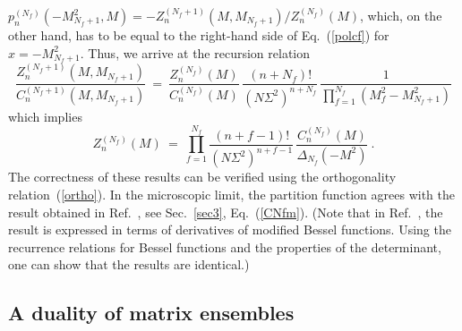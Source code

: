 $p_n^{(N_f)}(-M_{N_f+1}^2,M)=-Z_n^{(N_f+1)}(M,M_{N_f+1})/Z_n^{(N_f)}(M)$,
which, on the other hand, has to be equal to the right-hand side of
Eq.~(\ref{polcf}) for $x=-M_{N_f+1}^2$. Thus, we arrive at the
recursion relation
\begin{equation}
\frac{Z_n^{(N_f+1)}(M,M_{N_f+1})}{C_n^{(N_f+1)}(M,M_{N_f+1})} 
\ = \ \frac{Z_n^{(N_f)}(M)}{C_n^{(N_f)}(M)} 
       \, \frac{(n+N_f)!}{(N\Sigma^2)^{n+N_f}} \,
          \frac{1}{\prod_{f=1}^{N_f}(M_f^2-M_{N_f+1}^2)} 
\label{recurs}
\end{equation} 
which implies
\begin{equation}
Z_n^{(N_f)}(M) \ = \ \prod_{f=1}^{N_f} \frac{(n+f-1)!}
{(N\Sigma^2)^{n+f-1}}\,\frac{C_n^{(N_f)}(M)}{\Delta_{N_f}(-M^2)}\:.
\label{parterg}
\end{equation} 
The correctness of these results can be verified using the
orthogonality relation~(\ref{ortho}).  In the microscopic limit, the
partition function agrees with the result obtained in
Ref.~\cite{Jack96c}, see Sec.~\ref{sec3}, Eq.~(\ref{CNfm}).  (Note
that in Ref.~\cite{Jack96c}, the result is expressed in terms of
derivatives of modified Bessel functions.  Using the recurrence
relations for Bessel functions \cite{Grad65} and the properties of the
determinant, one can show that the results are identical.)


\subsection{A duality of matrix ensembles}
\label{sec23}

